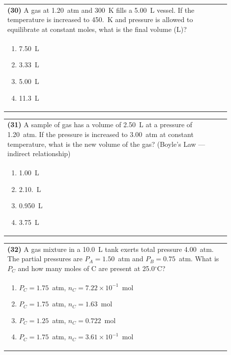 \documentclass{article}
\begin{document}
\vspace{0.2cm}
\noindent\begin{tabular}{|p{0.9\linewidth}|}
\hline
\textbf{(30)} A gas at 1.20~atm and 300~K fills a 5.00~L vessel. If the temperature is increased to 450.~K and pressure is allowed to equilibrate at constant moles, what is the final volume (L)?\\[0.2cm]

\begin{minipage}[t]{0.85\linewidth}
\begin{enumerate}[label=\alph*.]
\item 7.50~L
\item 3.33~L
\item 5.00~L
\item 11.3~L
\end{enumerate}
\end{minipage}\\[0.2cm]
\hline
\end{tabular}

\vspace{0.2cm}
\noindent\begin{tabular}{|p{0.9\linewidth}|}
\hline
\textbf{(31)} A sample of gas has a volume of 2.50~L at a pressure of 1.20~atm. If the pressure is increased to 3.00~atm at constant temperature, what is the new volume of the gas? (Boyle’s Law — indirect relationship)\\[0.2cm]

\begin{minipage}[t]{0.85\linewidth}
\begin{enumerate}[label=\alph*.]
\item 1.00~L
\item 2.10.~L
\item 0.950~L
\item 3.75~L
\end{enumerate}
\end{minipage}\\[0.2cm]
\hline
\end{tabular}

\vspace{0.2cm}
\noindent\begin{tabular}{|p{0.9\linewidth}|}
\hline
\textbf{(32)} A gas mixture in a 10.0~L tank exerts total pressure 4.00~atm. The partial pressures are $P_A=1.50$~atm and $P_B=0.75$~atm. What is $P_C$ and how many moles of C are present at 25.0$^\circ$C?\\[0.2cm]

\begin{minipage}[t]{0.85\linewidth}
\begin{enumerate}[label=\alph*.]
\item $P_C=1.75$~atm, $n_C=7.22\times10^{-1}$~mol
\item $P_C=1.75$~atm, $n_C=1.63$~mol
\item $P_C=1.25$~atm, $n_C=0.722$~mol
\item $P_C=1.75$~atm, $n_C=3.61\times10^{-1}$~mol
\end{enumerate}
\end{minipage}\\[0.2cm]
\hline
\end{tabular}
\end{document}

